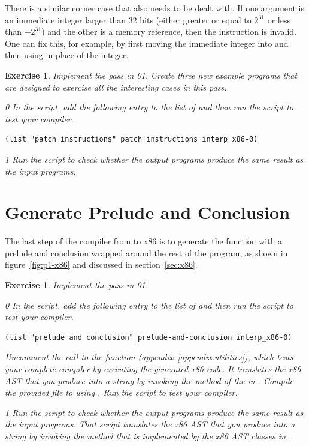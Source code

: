 \documentclass[7x10]{TimesAPriori_MIT}%
\def\racketEd{0}
\def\pythonEd{1}
\providecommand{\BookEdition}{1}
\let\edition\BookEdition
\newcommand{\racket}[1]{{\if\edition\racketEd{#1}\fi}}
\newcommand{\pythonColor}[0]{}
\newcommand{\python}[1]{{\if\edition\pythonEd\pythonColor #1\fi}}
\newtheorem{exercise}[theorem]{Exercise}
\numberwithin{theorem}{chapter}
\numberwithin{definition}{chapter}
\numberwithin{equation}{chapter}
\begin{document}
There is a similar corner case that also needs to be dealt with. If
one argument is an immediate integer larger than $32$ bits (either
greater or equal to $2^{31}$ or less than $-2^{31}$) and the
other is a memory reference, then the instruction is invalid.  One can
fix this, for example, by first moving the immediate integer into
 and then using  in place of the integer.

\begin{exercise}
\normalfont\normalsize Implement the  pass in
\racket{}\python{}.
Create three new example programs that are
designed to exercise all the interesting cases in this pass.
%
{\if\edition\racketEd
In the  script, add the following entry to the
list of  and then run the script to test your compiler.
\begin{lstlisting}
(list "patch instructions" patch_instructions interp_x86-0)
\end{lstlisting}
\fi}
{\if\edition\pythonEd\pythonColor
Run the  script to check
whether the output programs produce the same result as the input
programs.
\fi}
\end{exercise}


\section{Generate Prelude and Conclusion}
\label{sec:print-x86}

The last step of the compiler from \LangVar{} to x86 is to generate
the  function with a prelude and conclusion wrapped around
the rest of the program, as shown in figure~\ref{fig:p1-x86} and
discussed in section~\ref{sec:x86}.

\begin{exercise}\normalfont\normalsize
%
Implement the  pass in
\racket{}\python{}.
%
{\if\edition\racketEd
In the  script, add the following entry to the
list of  and then run the script to test your compiler.
\begin{lstlisting}
(list "prelude and conclusion" prelude-and-conclusion interp_x86-0)
\end{lstlisting}
%  
Uncomment the call to the  function
(appendix~\ref{appendix:utilities}), which tests your complete
compiler by executing the generated x86 code. It translates the x86
AST that you produce into a string by invoking the 
method of the  in . Compile
the provided  file to  using
. Run the script to test your compiler.
%
\fi}
{\if\edition\pythonEd\pythonColor
%
Run the  script to check whether the output
programs produce the same result as the input programs. That script
translates the x86 AST that you produce into a string by invoking the
 method that is implemented by the x86 AST classes in
.
%
\fi}

\end{exercise}
\end{document}

